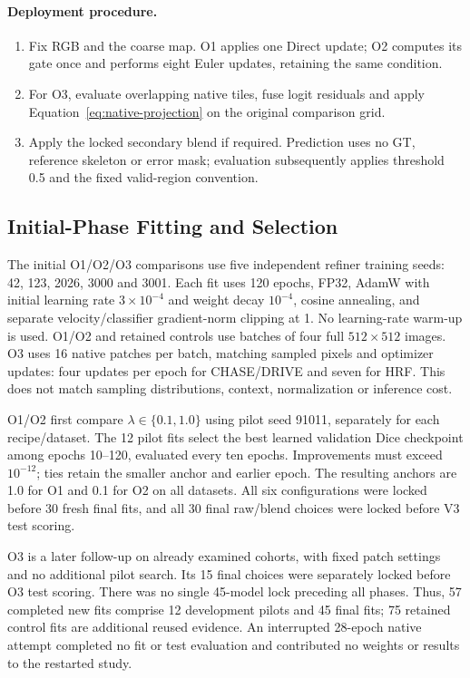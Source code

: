 \documentclass[jimaging,article,submit,pdftex,moreauthors]{Definitions/mdpi}
\begin{document}
\paragraph{Deployment procedure.}
\begin{enumerate}
\item Fix RGB and the coarse map. O1 applies one Direct update; O2 computes
its gate once and performs eight Euler updates, retaining the same condition.
\item For O3, evaluate overlapping native tiles, fuse logit residuals and
apply Equation~\eqref{eq:native-projection} on the original comparison grid.
\item Apply the locked secondary blend if required. Prediction uses no GT,
reference skeleton or error mask; evaluation subsequently applies threshold
0.5 and the fixed valid-region convention.
\end{enumerate}

\subsection{Initial-Phase Fitting and Selection}
The initial O1/O2/O3 comparisons use five independent refiner training seeds:
42, 123, 2026, 3000 and 3001. Each fit uses 120 epochs, FP32, AdamW with initial
learning rate $3\times10^{-4}$ and weight decay $10^{-4}$, cosine annealing,
and separate velocity/classifier gradient-norm clipping at 1. No learning-rate
warm-up is used. O1/O2 and retained controls use batches of four full
$512\times512$ images. O3 uses 16 native patches per batch, matching sampled
pixels and optimizer updates: four updates per epoch for CHASE/DRIVE and
seven for HRF. This does not match sampling distributions, context,
normalization or inference cost.

O1/O2 first compare $\lambda\in\{0.1,1.0\}$ using pilot seed 91011, separately
for each recipe/dataset. The 12 pilot fits select the best learned validation
Dice checkpoint among epochs 10--120, evaluated every ten epochs. Improvements
must exceed $10^{-12}$; ties retain the smaller anchor and earlier epoch.
The resulting anchors are 1.0 for O1 and 0.1 for O2 on all datasets. All six
configurations were locked before 30 fresh final fits, and all 30 final
raw/blend choices were locked before V3 test scoring.

O3 is a later follow-up on already examined cohorts, with fixed patch settings
and no additional pilot search. Its 15 final choices were separately locked
before O3 test scoring. There was no single 45-model lock preceding all phases.
Thus, 57 completed new fits comprise 12 development pilots and 45 final fits;
75 retained control fits are additional reused evidence. An interrupted
28-epoch native attempt completed no fit or test evaluation and contributed
no weights or results to the restarted study.
\end{document}
